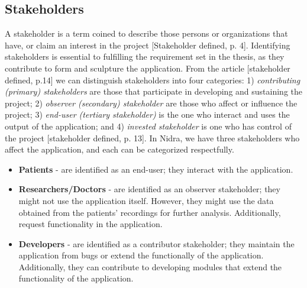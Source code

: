 \subsection{Stakeholders}
A stakeholder is a term coined to describe those persons or organizations that have, or claim an interest in the project [Stakeholder defined, p. 4].  Identifying stakeholders is essential to fulfilling the requirement set in the thesis, as they contribute to form and sculpture the application. From the article [stakeholder defined, p.14] we can distinguish stakeholders into four categories: 1) \textit{contributing (primary) stakeholders} are those that participate in developing and sustaining the project; 2) \textit{observer (secondary) stakeholder} are those who affect or influence the project;  3) \textit{end-user (tertiary stakeholder)} is the one who interact and uses the output of the application; and 4) \textit{invested stakeholder} is one who has control of the project  [stakeholder defined, p. 13]. In Nidra, we have three stakeholders who affect the application, and each can be categorized respectfully.
\begin{itemize}
    \item \textbf{Patients} - are identified as an end-user; they interact with the application.  
    \item \textbf{Researchers/Doctors} - are identified as an observer stakeholder; they might not use the application itself. However, they might use the data obtained from the patients' recordings for further analysis. Additionally, request functionality in the application.
    \item \textbf{Developers} - are identified as a contributor stakeholder; they maintain the application from bugs or extend the functionally of the application. Additionally, they can contribute to developing modules that extend the functionality of the application. 
\end{itemize}
